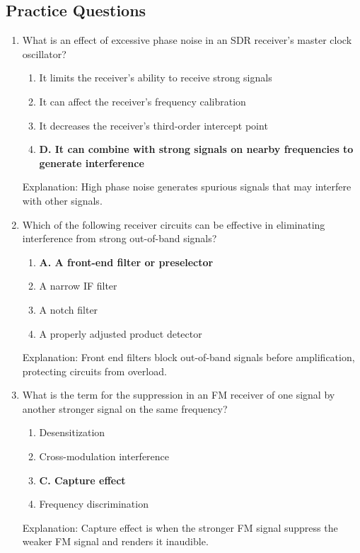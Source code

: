 \subsection*{Practice Questions}
\begin{enumerate}
     \item What is an effect of excessive phase noise in an SDR receiver's master clock oscillator?
       \begin{enumerate}
          \item  It limits the receiver's ability to receive strong signals
          \item  It can affect the receiver's frequency calibration
         \item  It decreases the receiver's third-order intercept point
        \item \textbf{D. It can combine with strong signals on nearby frequencies to generate interference}
       \end{enumerate}
         \textcolor{myred}{Explanation:}
     High phase noise generates spurious signals that may interfere with other signals.

     \item Which of the following receiver circuits can be effective in eliminating interference from strong out-of-band signals?
      \begin{enumerate}
         \item \textbf{A. A front-end filter or preselector}
        \item  A narrow IF filter
         \item  A notch filter
        \item  A properly adjusted product detector
    \end{enumerate}
    \textcolor{myred}{Explanation:}
    Front end filters block out-of-band signals before amplification, protecting circuits from overload.
       
      \item What is the term for the suppression in an FM receiver of one signal by another stronger signal on the same frequency?
        \begin{enumerate}
        \item  Desensitization
       \item  Cross-modulation interference
    \item \textbf{C. Capture effect}
     \item  Frequency discrimination
     \end{enumerate}
        \textcolor{myred}{Explanation:}
       Capture effect is when the stronger FM signal suppress the weaker FM signal and renders it inaudible.
        

\end{enumerate}
